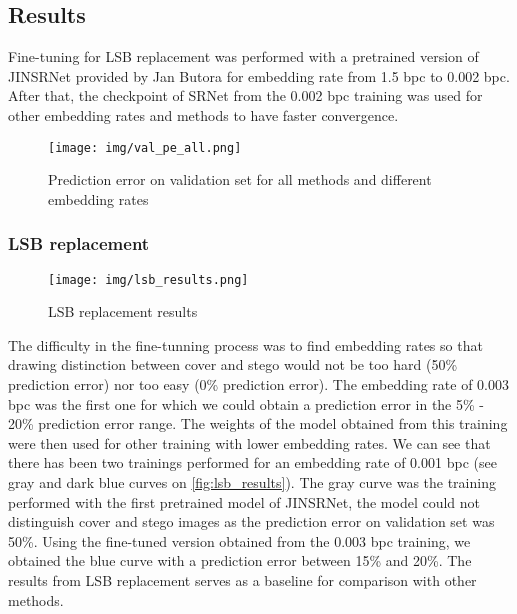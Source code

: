 \documentclass[12pt]{article}
\begin{document}
\subsection{Results}
Fine-tuning for LSB replacement was performed with a pretrained version of JINSRNet provided by Jan Butora for embedding rate from 1.5 bpc to 0.002 bpc. After that, the checkpoint of SRNet from the 0.002 bpc training  was used for other embedding rates and methods to have faster convergence.
\begin{figure}[H]
    \texttt{[image: img/val\_pe\_all.png]}
    \caption[Steganalysis results]{Prediction error on validation set for all methods and 
    different embedding rates}
    \label{fig:results}
\end{figure}

\subsubsection{LSB replacement}
\begin{figure}[H]
    \texttt{[image: img/lsb\_results.png]}
    \caption[LSB replacement result]{LSB replacement results}
    \label{fig:lsb_results}
\end{figure}
The difficulty in the fine-tunning process was to find embedding rates so that drawing distinction between cover and stego would not be too hard (50\% prediction error) nor too easy (0\% prediction error). The embedding rate of 0.003 bpc was the first one for which we could obtain a prediction error in the 5\% - 20\% prediction error range. The weights of the model obtained from this training were then used for other training with lower embedding rates. We can see that there has been two trainings performed for an embedding rate of 0.001 bpc (see gray and dark blue curves on \autoref{fig:lsb_results}). The gray curve was the training performed with the first pretrained model of JINSRNet, the model could not distinguish cover and stego images as the prediction error on validation set was 50\%. Using the fine-tuned version obtained from the 0.003 bpc training, we obtained the blue curve with a prediction error between 15\% and 20\%. The results from LSB replacement serves as a baseline for comparison with other methods.
\end{document}
